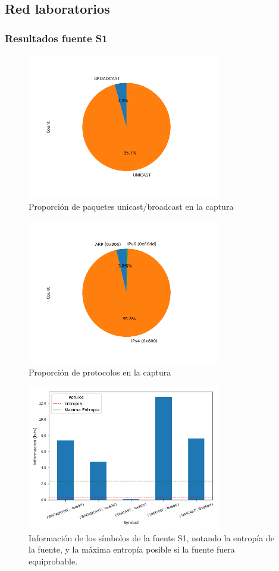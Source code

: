\subsection*{Red laboratorios}
\subsubsection*{Resultados fuente S1}
\begin{figure}[H]
  \centering
  \includegraphics[width=8.5cm]{figs/broadcast_proportion_labo6_2018_04_18_S1_output.png}
  \caption{\normalfont Proporción de paquetes unicast/broadcast en la captura}
\end{figure}

\begin{figure}[H]
  \centering
  \includegraphics[width=8.5cm]{figs/protocols_proportion_labo6_2018_04_18_S1_output.png}
  \caption{\normalfont Proporción de protocolos en la captura}
\end{figure}

\begin{figure}[H]
  \centering
  \includegraphics[width=8.5cm]{figs/information_labo6_2018_04_18_S1_output.png}
  \caption{\normalfont Información de los símbolos de la fuente S1, notando la entropía de la fuente, y la máxima entropía posible si la fuente fuera equiprobable.}
\end{figure}

